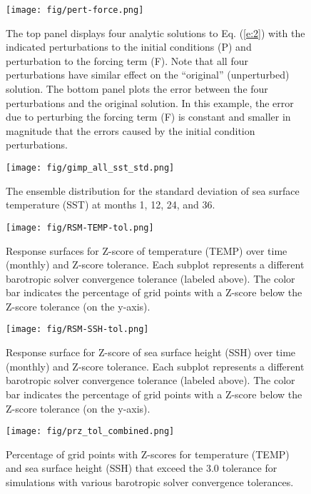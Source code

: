 \documentclass[gmd, manuscript]{copernicus}
\begin{document}
\clearpage
\begin {figure}[h]
\centering
\texttt{[image: fig/pert-force.png]}
\caption{The top panel displays four analytic solutions to Eq. (\ref{e:2}) with the indicated perturbations to the initial conditions (P) and perturbation to the forcing term (F).  Note that all four perturbations have similar effect on the ``original'' (unperturbed) solution.  The bottom panel plots the error between the four perturbations and the original solution. In this example, the error due to perturbing the forcing term (F) is constant and smaller in magnitude that the errors caused by the initial condition perturbations.}
\label {fig:1Danalytical}
\end {figure}

\clearpage
\begin {figure}[h]
\centering
\texttt{[image: fig/gimp\_all\_sst\_std.png]}
\caption{The ensemble distribution for the standard deviation of sea surface temperature (SST) at months 1, 12, 24, and 36.}
\label{fig:SST_STD_all}
\end {figure}

\clearpage
\begin {figure}[h]
\centering
\texttt{[image: fig/RSM-TEMP-tol.png]}
\caption {Response surfaces for Z-score of temperature (TEMP) over time (monthly) and  Z-score tolerance.  Each subplot represents a different barotropic
solver convergence tolerance (labeled above). The color bar indicates the percentage of grid points with a Z-score below the Z-score tolerance (on the y-axis).}
\label{fig:RSM-TEMP-tol}
\end {figure}

\clearpage
\begin {figure}[h]
\centering
\texttt{[image: fig/RSM-SSH-tol.png]}
\caption {Response surface for Z-score of sea surface height (SSH) over time (monthly) and Z-score tolerance.  Each subplot represents a different barotropic
solver convergence tolerance (labeled above). The color bar indicates the percentage of grid points with a Z-score below the Z-score tolerance (on the y-axis).}
\label{fig:RSM-SSH-tol}
\end {figure}


\clearpage
\begin{figure}[h]
\centering 
\texttt{[image: fig/prz\_tol\_combined.png]}
\caption {Percentage of grid points with Z-scores for temperature
  (TEMP) and sea surface height (SSH) that exceed the 3.0 tolerance for simulations with various barotropic solver convergence tolerances. }
\label {fig:PRZ-tol}
\end{figure}
\end{document}

